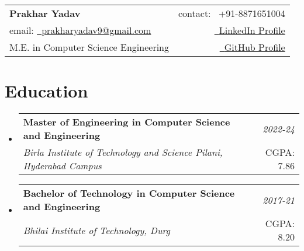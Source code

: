 \documentclass[a4paper,11pt]{article}
\makeatletter
\newcommand{\resumeSubheading}[4]{
\vspace{0.5mm}\item
    \begin{tabular*}{0.98\textwidth}[t]{l@{\extracolsep{\fill}}r}
        \textbf{#1} & \textit{\footnotesize{#4}} \\
        \textit{\footnotesize{#3}} &  \footnotesize{#2}\\
    \end{tabular*}
    \vspace{-1.3mm}
}
\newcommand{\resumeSubHeadingListStart}{\begin{itemize}[leftmargin=*,labelsep=0mm]}
\newcommand{\resumeSubHeadingListEnd}{\end{itemize}\vspace{2mm}}
\newcommand{\name}{Prakhar Yadav} %
\newcommand{\phone}{8871651004} %
\newcommand{\emaila}{prakharyadav9@gmail.com} %
\makeatother
\begin{document}
\selectfont

{
\begin{tabularx}{\linewidth}{L r} \\
  \textbf{\Large \name} & {contact: }{\raisebox{0.0\height}{\footnotesize \faPhone}\ +91-\phone}\\
  {email: }\href{mailto:\emaila}{\raisebox{0.0\height}{\footnotesize \faEnvelope}\ {\emaila}}  & \href{https://www.linkedin.com/in/prakhar-yadav}{\raisebox{0.0\height}{\footnotesize \faLinkedin}\ {LinkedIn Profile}} \\
  M.E. in Computer Science Engineering & \href{https://github.com/prakharyadav-9}{\raisebox{0.0\height}{\footnotesize \faGithub}\ {GitHub Profile}} \\  
\end{tabularx}
}

\vspace{-5.5mm}
% 
\section{\textbf{Education}}
  \resumeSubHeadingListStart
    \resumeSubheading
      {Master of Engineering in Computer Science and Engineering}{CGPA: 7.86}
      {Birla Institute of Technology and Science Pilani, Hyderabad Campus}{2022-24}
  \resumeSubHeadingListEnd
\vspace{-6.6mm}
\resumeSubHeadingListStart
    \resumeSubheading
      {Bachelor of Technology in Computer Science and Engineering}{CGPA: 8.20}
      {Bhilai Institute of Technology, Durg}{2017-21}
  \resumeSubHeadingListEnd
\vspace{-7.6mm}
\end{document}

